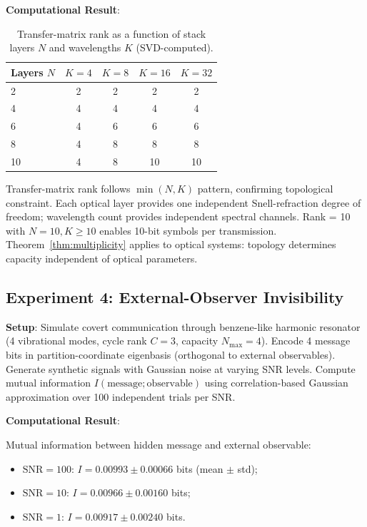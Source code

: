 \documentclass[11pt,twocolumn,a4paper]{article}
\theoremstyle{definition}
\begin{document}
\textbf{Computational Result}:

\begin{table}[H]
\centering\small
\caption{Transfer-matrix rank as a function of stack layers $N$ and wavelengths $K$ (SVD-computed).}
\begin{tabular}{lcccc}
\toprule
Layers $N$ & $K=4$ & $K=8$ & $K=16$ & $K=32$ \\
\midrule
2 & 2 & 2 & 2 & 2 \\
4 & 4 & 4 & 4 & 4 \\
6 & 4 & 6 & 6 & 6 \\
8 & 4 & 8 & 8 & 8 \\
10 & 4 & 8 & 10 & 10 \\
\bottomrule
\end{tabular}
\end{table}

Transfer-matrix rank follows $\min(N, K)$ pattern, confirming topological constraint. Each optical layer provides one independent Snell-refraction degree of freedom; wavelength count provides independent spectral channels. Rank = 10 with $N=10, K \geq 10$ enables 10-bit symbols per transmission. Theorem~\ref{thm:multiplicity} applies to optical systems: topology determines capacity independent of optical parameters.

\subsection{Experiment 4: External-Observer Invisibility}

\textbf{Setup}: Simulate covert communication through benzene-like harmonic resonator (4 vibrational modes, cycle rank $C=3$, capacity $N_{\max}=4$). Encode 4 message bits in partition-coordinate eigenbasis (orthogonal to external observables). Generate synthetic signals with Gaussian noise at varying SNR levels. Compute mutual information $I(\text{message}; \text{observable})$ using correlation-based Gaussian approximation over 100 independent trials per SNR.

\textbf{Computational Result}:

Mutual information between hidden message and external observable:
\begin{itemize}[nosep]
\item $\text{SNR} = 100$: $I = 0.00993 \pm 0.00066$ bits (mean $\pm$ std);
\item $\text{SNR} = 10$: $I = 0.00966 \pm 0.00160$ bits;
\item $\text{SNR} = 1$: $I = 0.00917 \pm 0.00240$ bits.
\end{itemize}
\end{document}
